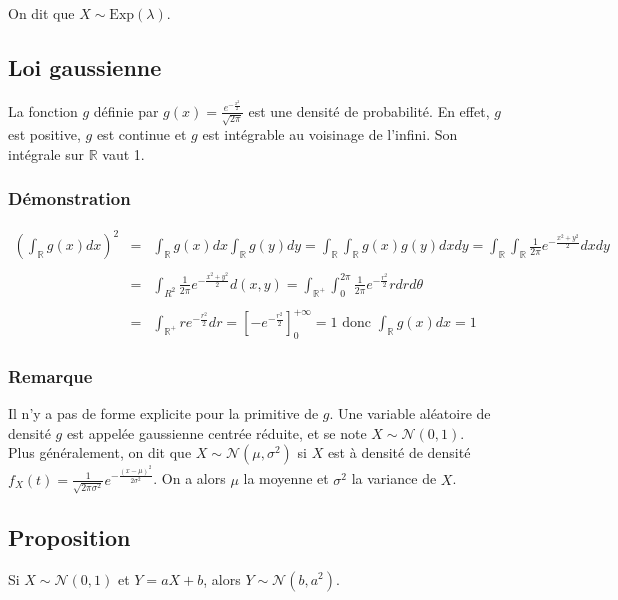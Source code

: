 \documentclass[a4paper,10pt]{book} %
\newcommand{\R}{\mathbb{R}}
\newcommand{\Exp}{\mathrm{Exp}} %
\newcommand{\Nor}{\mathcal{N}} %
\begin{document}
On dit que $X\sim \Exp(\lambda)$.

\subsection{Loi gaussienne}
La fonction $g$ définie par $\displaystyle g(x)=\frac{e^{-\frac{x^2}{2}}}{\sqrt{2\pi}}$ est une densité de probabilité. En effet, $g$ est positive, $g$ est continue et $g$ est intégrable au voisinage de l'infini. Son intégrale sur $\R$ vaut 1.

\subsubsection{Démonstration}
$\begin{array}{rcl}\displaystyle (\int_\R g(x)dx)^2 &=& \displaystyle \int_\R g(x)dx\int_\R g(y)dy = \int_\R\int_\R g(x)g(y)dxdy = \int_\R\int_\R\frac{1}{2\pi}e^{-\frac{x^2+y^2}{2}}dxdy \\\\
&=&\displaystyle \int_{R^2}\frac{1}{2\pi}e^{-\frac{x^2+y^2}{2}} d(x,y) = \int_{\R^+}\int_{0}^{2\pi}\frac{1}{2\pi}e^{-\frac{r^2}{2}}rdrd\theta \\\\
&=&\displaystyle \int_{\R^+}re^{-\frac{r^2}{2}}dr = \left[-e^{-\frac{r^2}{2}}\right]_0^{+\infty}=1 \text{ donc }\int_\R g(x)dx=1\end{array}$

\subsubsection{Remarque}
Il n'y a pas de forme explicite pour la primitive de $g$. Une variable aléatoire de densité $g$ est appelée gaussienne centrée réduite, et se note $X\sim \Nor(0,1)$.\\

Plus généralement, on dit que $X\sim\Nor(\mu, \sigma^2)$ si $X$ est à densité de densité $\displaystyle f_X(t)= \frac{1}{\sqrt{2\pi\sigma^2}}e^{-\frac{(x-\mu)^2}{2\sigma^2}}$. On a alors $\mu$ la moyenne et $\sigma^2$ la variance de $X$.

\subsection{Proposition}
Si $X\sim\Nor(0,1)$ et $Y = aX+b$, alors $Y\sim\Nor(b,a^2)$.
\end{document}

